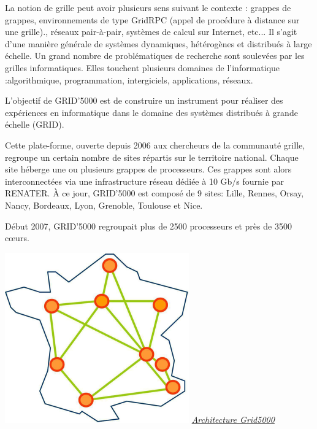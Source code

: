 La notion de grille peut avoir plusieurs sens suivant le
contexte : grappes de grappes, environnements de type
GridRPC (appel de procédure à distance sur une grille).,
réseaux pair-à-pair, systèmes de calcul sur Internet, etc...
Il s’agit d’une manière générale de systèmes dynamiques,
hétérogènes et distribués à large échelle. Un grand
nombre de problématiques de recherche sont soulevées
par les grilles informatiques. Elles touchent plusieurs
domaines de l’informatique :algorithmique,
programmation, intergiciels, applications, réseaux.

L’objectif de GRID’5000 est de construire un instrument
pour réaliser des expériences en informatique dans le
domaine des systèmes distribués à grande échelle (GRID).

Cette plate-forme, ouverte depuis 2006 aux chercheurs de
la communauté grille, regroupe un certain nombre de sites
répartis sur le territoire national. Chaque site héberge une
ou plusieurs grappes de processeurs. Ces grappes sont
alors interconnectées via une infrastructure réseau dédiée
à 10 Gb/s fournie par RENATER. À ce jour, GRID’5000
est composé de 9 sites: Lille, Rennes, Orsay, Nancy,
Bordeaux, Lyon, Grenoble, Toulouse et Nice.

Début 2007, GRID’5000 regroupait plus de 2500 processeurs et près
de 3500 cœurs.

\newpage
\begin{center}
\includegraphics{images/g5k.png}
\underline{\textit{Architecture Grid5000}}
\end{center}



